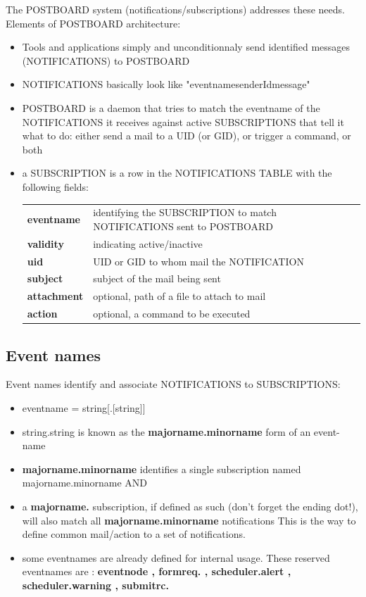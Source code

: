 The \webobs POSTBOARD system (notifications/subscriptions) addresses these needs. Elements of POSTBOARD architecture: 

\begin{itemize}
\item   Tools and applications simply and unconditionnaly send identified messages (NOTIFICATIONS) to POSTBOARD
\item   NOTIFICATIONS basically look like "eventname\textbar senderId\textbar message" 
\item   POSTBOARD is a daemon that tries to match the eventname of the NOTIFICATIONS it receives against active SUBSCRIPTIONS that 
tell it what to do: either send a mail to a UID (or GID), or trigger a command, or both
\item   a SUBSCRIPTION is a row in the \webobs NOTIFICATIONS TABLE with the following fields:

\begin{tabular}{ll}
\textbf{eventname} & identifying the SUBSCRIPTION to match NOTIFICATIONS sent to POSTBOARD\\ 
\textbf{validity}  & indicating active/inactive              \\  
\textbf{uid}       & UID or GID to whom mail the NOTIFICATION\\
\textbf{subject}   & subject of the mail being sent          \\  
\textbf{attachment}& optional, path of a file to attach to mail \\
\textbf{action}    & optional, a command to be executed      \\  
\end{tabular}
\end{itemize}

\subsection{Event names}

Event names identify and associate NOTIFICATIONS to SUBSCRIPTIONS:  
\begin{itemize}
\item   eventname    = string[.[string]] 
\item   string.string is known as the \textbf{majorname.minorname} form of an event-name
\item   \textbf{majorname.minorname} identifies a single subscription named majorname.minorname AND  
\item   a \textbf{majorname.} subscription, if defined as such (don't forget the ending dot!), will also match all \textbf{majorname.minorname} notifications
This is the way to define common mail/action to a set of notifications.
\item   some eventnames are already defined for internal \webobs usage. These reserved eventnames are :
\textbf{eventnode , formreq. , scheduler.alert , scheduler.warning , submitrc. }
\end{itemize}

